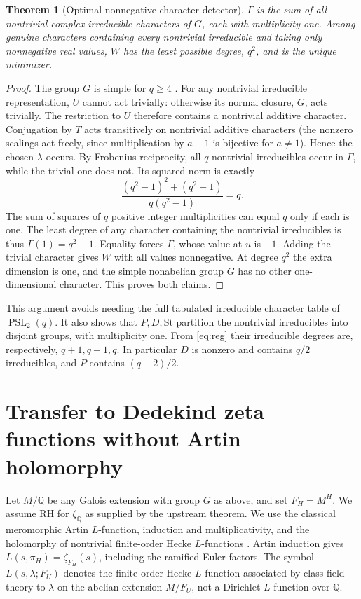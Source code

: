 \documentclass[11pt]{article}
\newtheorem{theorem}{Theorem}[section]
\theoremstyle{remark}\newtheorem{remark}[theorem]{Remark}
\DeclareMathOperator{\PSL}{PSL}\DeclareMathOperator{\SL}{SL}\DeclareMathOperator{\PGL}{PGL}\DeclareMathOperator{\Ind}{Ind}\DeclareMathOperator{\ord}{ord}\DeclareMathOperator{\Gal}{Gal}\DeclareMathOperator{\Tr}{Tr}\DeclareMathOperator{\Rea}{Re}\DeclareMathOperator{\FP}{FP}
\newcommand{\Q}{\mathbb Q}\newcommand{\C}{\mathbb C}\newcommand{\F}{\mathbb F}\newcommand{\one}{\mathbf 1}\newcommand{\St}{\mathrm{St}}\newcommand{\Gg}{\Gamma}\newcommand{\PT}{\mathcal P}\newcommand{\eps}{\varepsilon}
\begin{document}
\begin{theorem}[Optimal nonnegative character detector]\label{thm:detector}
$\Gg$ is the sum of all nontrivial complex irreducible characters of $G$, each with multiplicity one. Among genuine characters containing every nontrivial irreducible and taking only nonnegative real values, $W$ has the least possible degree, $q^2$, and is the unique minimizer.
\end{theorem}
\begin{proof}
The group $G$ is simple for $q\ge4$ \cite[Appendix]{dickson}. For any nontrivial irreducible representation, $U$ cannot act trivially: otherwise its normal closure, $G$, acts trivially. The restriction to $U$ therefore contains a nontrivial additive character. Conjugation by $T$ acts transitively on nontrivial additive characters (the nonzero scalings act freely, since multiplication by $a-1$ is bijective for $a\ne1$). Hence the chosen $\lambda$ occurs. By Frobenius reciprocity, all $q$ nontrivial irreducibles occur in $\Gg$, while the trivial one does not. Its squared norm is exactly
\[
 \frac{(q^2-1)^2+(q^2-1)}{q(q^2-1)}=q.
\]
The sum of squares of $q$ positive integer multiplicities can equal $q$ only if each is one. The least degree of any character containing the nontrivial irreducibles is thus $\Gg(1)=q^2-1$. Equality forces $\Gg$, whose value at $u$ is $-1$. Adding the trivial character gives $W$ with all values nonnegative. At degree $q^2$ the extra dimension is one, and the simple nonabelian group $G$ has no other one-dimensional character. This proves both claims.
\end{proof}
This argument avoids needing the full tabulated irreducible character table of $\PSL_2(q)$. It also shows that $P,D,\St$ partition the nontrivial irreducibles into disjoint groups, with multiplicity one. From \eqref{eq:reg} their irreducible degrees are, respectively, $q+1,q-1,q$. In particular $D$ is nonzero and contains $q/2$ irreducibles, and $P$ contains $(q-2)/2$.

\section{Transfer to Dedekind zeta functions without Artin holomorphy}
Let $M/\Q$ be any Galois extension with group $G$ as above, and set $F_H=M^H$. We assume RH for $\zeta_{\Q}$ as supplied by the upstream theorem. We use the classical meromorphic Artin $L$-function, induction and multiplicativity, and the holomorphy of nontrivial finite-order Hecke $L$-functions \cite{neukirch}. Artin induction gives $L(s,\pi_H)=\zeta_{F_H}(s)$, including the ramified Euler factors. The symbol $L(s,\lambda;F_U)$ denotes the finite-order Hecke $L$-function associated by class field theory to $\lambda$ on the abelian extension $M/F_U$, not a Dirichlet $L$-function over $\Q$.
\end{document}
